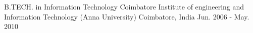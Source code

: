

\begin{cventries}

  \cventry
    {B.TECH. in Information Technology} %
    {Coimbatore Institute of engineering and Information Technology (Anna University)} %
    {Coimbatore, India} %
    {Jun. 2006 - May. 2010} %
    {
      \begin{cvitems} %
        \item {}
      \end{cvitems}
    }

\end{cventries}
